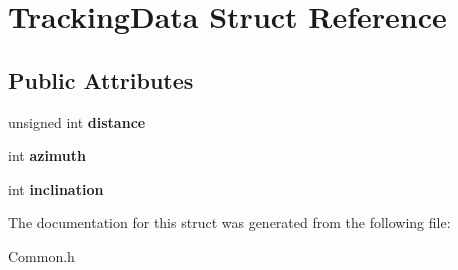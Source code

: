 \hypertarget{struct_tracking_data}{\section{Tracking\+Data Struct Reference}
\label{struct_tracking_data}
}
\subsection*{Public Attributes}
\begin{DoxyCompactItemize}
\item 
\hypertarget{struct_tracking_data_a94987e3b730235eefc31e9c100cd8738}{unsigned int {\bfseries distance}}\label{struct_tracking_data_a94987e3b730235eefc31e9c100cd8738}

\item 
\hypertarget{struct_tracking_data_ad8307761948b5ad031f45d391af4323f}{int {\bfseries azimuth}}\label{struct_tracking_data_ad8307761948b5ad031f45d391af4323f}

\item 
\hypertarget{struct_tracking_data_ab73b8a7fc1cb61af2d9f6209258613af}{int {\bfseries inclination}}\label{struct_tracking_data_ab73b8a7fc1cb61af2d9f6209258613af}

\end{DoxyCompactItemize}


The documentation for this struct was generated from the following file\+:\begin{DoxyCompactItemize}
\item 
Common.\+h\end{DoxyCompactItemize}
